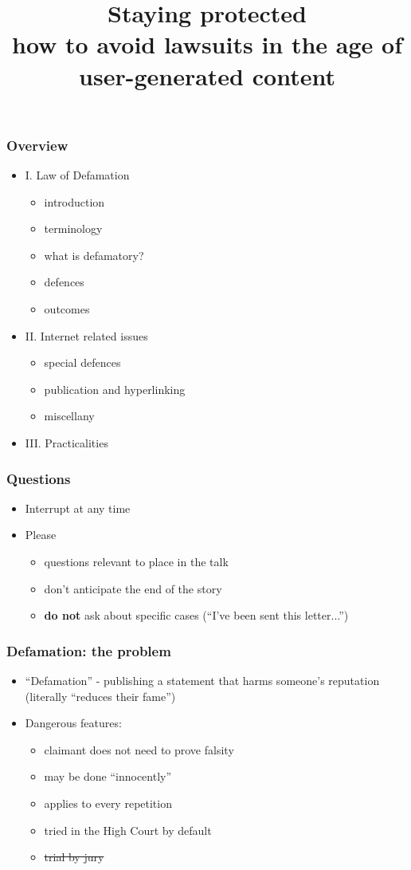 \documentclass[ignorenonframetext,]{beamer}
\title{Staying protected \\
how to avoid lawsuits in the age of user-generated content}
\date{}
\begin{document}
\frame{\titlepage}

\begin{frame}
\frametitle{Overview}
\begin{itemize}
\item  I. Law of Defamation

  \begin{itemize}
  \item introduction
  \item terminology
  \item what is defamatory?
  \item defences
  \item outcomes
  \end{itemize}
\item  II. Internet related issues

  \begin{itemize}
  \item  special defences
  \item  publication and hyperlinking
  \item  miscellany
  \end{itemize}
\item  III. Practicalities
\end{itemize}

\end{frame}

\begin{frame}
  \frametitle{Questions}
  \begin{itemize}
  \item Interrupt at any time
  \item Please
    \begin{itemize}
    \item questions relevant to place in the talk
    \item don't anticipate the end of the story
    \item {\bf do not} ask about specific cases (``I've been sent this letter...'')
    \end{itemize}
  \end{itemize}
\end{frame}

\begin{frame}
\frametitle{Defamation: the problem}
\begin{itemize}
\item ``Defamation'' - publishing a statement that harms someone's reputation (literally ``reduces their fame'')
\item Dangerous features:
  \begin{itemize}
  \item claimant does not need to prove falsity
  \item may be done ``innocently''
  \item applies to every repetition
  \item tried in the High Court by default
  \item \sout{trial by jury}
  \end{itemize}
\end{itemize}
\end{frame}
\end{document}
